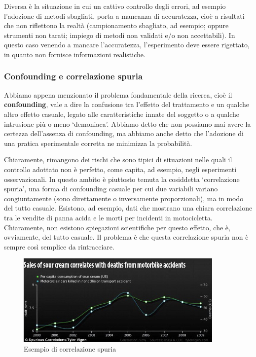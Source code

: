 \documentclass[a4paper,12pt,oneside]{book}
\begin{document}
Diversa è la situazione in cui un cattivo controllo degli errori, ad
esempio l'adozione di metodi sbagliati, porta a mancanza di accuratezza,
cioè a risultati che non riflettono la realtà (campionamento sbagliato,
ad esempio; oppure strumenti non tarati; impiego di metodi non validati
e/o non accettabili). In questo caso venendo a mancare l'accuratezza,
l'esperimento deve essere rigettato, in quanto non fornisce informazioni
realistiche.

\subsubsection{Confounding e correlazione
spuria}\label{confounding-e-correlazione-spuria}

Abbiamo appena menzionato il problema fondamentale della ricerca, cioè
il \textbf{confounding}, vale a dire la confusione tra l'effetto del
trattamento e un qualche altro effetto casuale, legato alle
caratteristiche innate del soggetto o a qualche intrusione più o meno
`demoniaca'. Abbiamo detto che non possiamo mai avere la certezza
dell'assenza di confounding, ma abbiamo anche detto che l'adozione di
una pratica sperimentale corretta ne minimizza la probabilità.

Chiaramente, rimangono dei rischi che sono tipici di situazioni nelle
quali il controllo adottato non è perfetto, come capita, ad esempio,
negli esperimenti osservazionali. In questo ambito è piuttosto temuta la
cosiddetta `correlazione spuria', una forma di confounding casuale per
cui due variabili variano congiuntamente (sono direttamente o
inversamente proporzionali), ma in modo del tutto casuale. Esistono, ad
esempio, dati che mostrano una chiara correlazione tra le vendite di
panna acida e le morti per incidenti in motocicletta. Chiaramente, non
esistono spiegazioni scientifiche per questo effetto, che è, ovviamente,
del tutto casuale. Il problema è che questa correlazione spuria non è
sempre così semplice da rintracciare.

\begin{figure}
\centering
\includegraphics[width=0.90000\textwidth]{_images/PannaAcida.png}
\caption{Esempio di correlazione spuria}
\end{figure}
\end{document}

